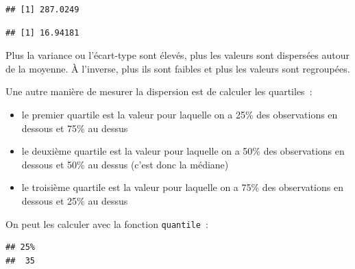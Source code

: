 \documentclass[12pt,]{book}
\newenvironment{Shaded}{\begin{snugshade}}{\end{snugshade}}
\newcommand{\CommentTok}[1]{\textcolor[rgb]{0.37,0.37,0.37}{\textit{#1}}}
\newcommand{\DataTypeTok}[1]{\textcolor[rgb]{0.27,0.27,0.27}{#1}}
\newcommand{\FloatTok}[1]{\textcolor[rgb]{0.06,0.06,0.06}{#1}}
\newcommand{\KeywordTok}[1]{\textcolor[rgb]{0.27,0.27,0.27}{\textbf{#1}}}
\newcommand{\NormalTok}[1]{#1}
\newcommand{\OperatorTok}[1]{\textcolor[rgb]{0.43,0.43,0.43}{\textbf{#1}}}
\providecommand{\tightlist}{%
  \setlength{\itemsep}{0pt}\setlength{\parskip}{0pt}}
\begin{document}
\begin{Shaded}
\end{Shaded}

\begin{verbatim}
## [1] 287.0249
\end{verbatim}

\begin{Shaded}
\end{Shaded}

\begin{verbatim}
## [1] 16.94181
\end{verbatim}

Plus la variance ou l'écart-type sont élevés, plus les valeurs sont dispersées autour de la moyenne. À l'inverse, plus ils sont faibles et plus les valeurs sont regroupées.

Une autre manière de mesurer la dispersion est de calculer les quartiles~:

\begin{itemize}
\tightlist
\item
  le premier quartile est la valeur pour laquelle on a 25\% des observations en dessous et 75\% au dessus
\item
  le deuxième quartile est la valeur pour laquelle on a 50\% des observations en dessous et 50\% au dessus (c'est donc la médiane)
\item
  le troisième quartile est la valeur pour laquelle on a 75\% des observations en dessous et 25\% au dessus
\end{itemize}

On peut les calculer avec la fonction \texttt{quantile}~:

\begin{Shaded}
\end{Shaded}

\begin{verbatim}
## 25% 
##  35
\end{verbatim}
\end{document}
